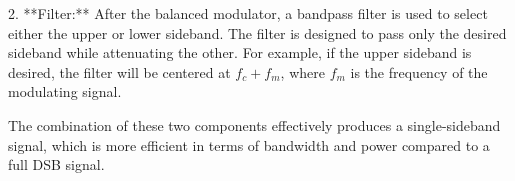2. **Filter:** After the balanced modulator, a bandpass filter is used to select either the upper or lower sideband. The filter is designed to pass only the desired sideband while attenuating the other. For example, if the upper sideband is desired, the filter will be centered at \( f_c + f_m \), where \( f_m \) is the frequency of the modulating signal.

The combination of these two components effectively produces a single-sideband signal, which is more efficient in terms of bandwidth and power compared to a full DSB signal.

